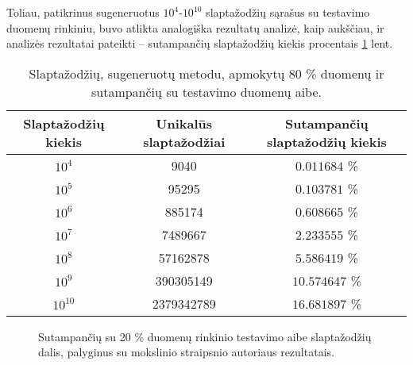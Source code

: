 \documentclass{VUMIFInfBakalaurinis}
\begin{document}
Toliau, patikrinus sugeneruotus $10^4$-$10^{10}$ slaptažodžių sąrašus su 
 testavimo duomenų rinkiniu, buvo atlikta analogiška 
rezultatų analizė, kaip aukščiau, ir analizės rezultatai pateikti -- sutampančių 
slaptažodžių kiekis procentais \ref{tab:passganlinkedinresults} lent.

\begin{table}[hb]
  \centering
  \caption{
    Slaptažodžių, sugeneruotų  metodu, apmokytų 80 \% 
     duomenų ir sutampančių su  testavimo 
    duomenų aibe.
  }
  \begin{tabular}{|c|c|c|}
    \hline \textbf{Slaptažodžių kiekis} & \textbf{Unikalūs slaptažodžiai} & 
    \textbf{Sutampančių slaptažodžių kiekis} \\
    \hline $10^4$ & 9040 & $0.011684$ \% \\
    \hline $10^5$ & 95295 & $0.103781$ \% \\
    \hline $10^6$ & 885174 & $0.608665$ \% \\
    \hline $10^7$ & 7489667 & $2.233555$ \% \\
    \hline $10^8$ & 57162878 & $5.586419$ \% \\
    \hline $10^9$ & 390305149 & $10.574647$ \% \\
    \hline $10^{10}$ & 2379342789 & $16.681897$ \% \\
    \hline
  \end{tabular}
  \label{tab:passganlinkedinresults}
\end{table}

\begin{figure}[!ht]
  \begin{center}
  \end{center}
  \caption{
    Sutampančių su 20 \%  duomenų rinkinio testavimo aibe 
    slaptažodžių dalis, palyginus su  mokslinio straipsnio 
    autoriaus rezultatais.
  }
  \label{plot:passgancomparison}
\end{figure}
\end{document}
